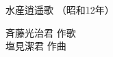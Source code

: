 \documentclass[10pt,b5j]{tarticle} %
\begin{document}
\begin{minipage}[c]{0.7\hsize} %
    \begin{center}
        {\LARGE
            水産逍遥歌 %
        }
        {\small 
            （昭和12年） %
        }
    \end{center}
\end{minipage}
\begin{minipage}[c]{0.3\hsize} %
    \begin{flushright} %
        斉藤光治君 作歌\\塩見潔君 作曲 %
    \end{flushright}
\end{minipage}
\end{document}
